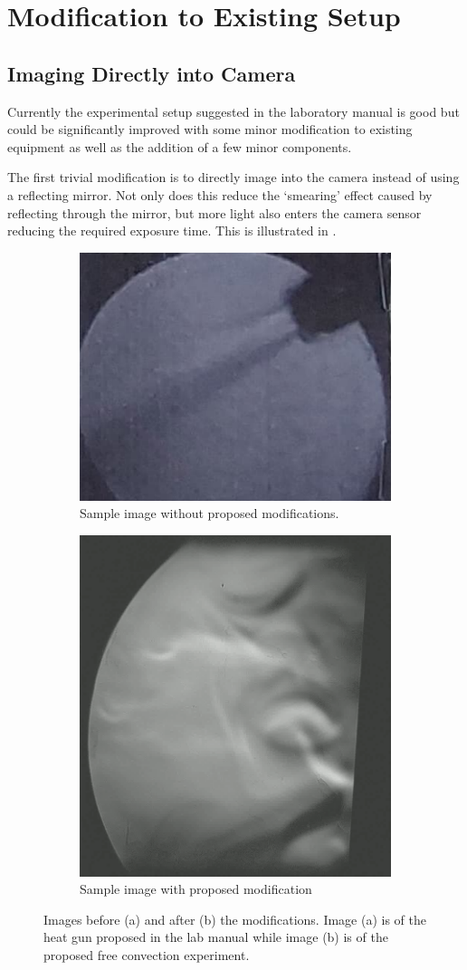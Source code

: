 \documentclass[aip, cp, amsmath, amssymb, reprint, nofootinbib]{revtex4-2}
\begin{document}
    \section{Modification to Existing Setup}
        \subsection{Imaging Directly into Camera}
        Currently the experimental setup suggested in the laboratory manual is good but could be significantly improved with some minor modification to existing equipment as well as the addition of a few minor components. 

        The first trivial modification is to directly image into the camera instead of using a reflecting mirror. Not only does this reduce the `smearing' effect caused by reflecting through the mirror, but more light also enters the camera sensor reducing the required exposure time. This is illustrated in . 

        \begin{figure}[H]
            \centering
            \begin{subfigure}{0.49\linewidth}
                \centering
                \includegraphics[width=0.5\linewidth]{figures/pre.png}
                \caption{Sample image without proposed modifications.}
                \label{fig:direct-image}
            \end{subfigure}
            \begin{subfigure}{0.49\linewidth}
                \centering
                \includegraphics[width=0.4\linewidth, angle=-90]{figures/sampleC.png}
                \caption{Sample image with proposed modification}
                \label{fig:freeconvection}
            \end{subfigure}
            \caption{Images before (a) and after (b) the modifications. Image (a) is of the heat gun proposed in the lab manual \cite{manual} while image (b) is of the proposed free convection experiment.}
        \end{figure}
\end{document}
